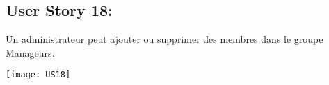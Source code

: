 \newpage{}
\subsection{User Story 18:}
Un administrateur peut ajouter ou supprimer des membres dans le groupe Manageurs.


  \begin{center}
        \texttt{[image: US18]}
  \end{center}